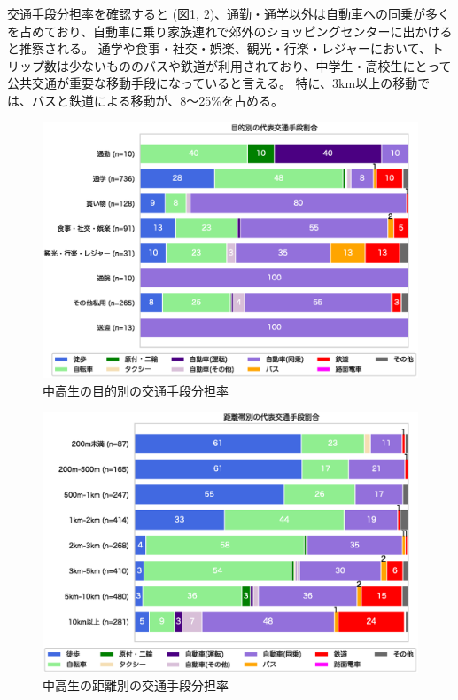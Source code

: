 \documentclass[a4paper,12pt, uplatex]{jsbook}
\begin{document}
\clearpage
交通手段分担率を確認すると (図\ref{fig:mode_share_purpose_school}, \ref{fig:mode_share_dist_school})、通勤・通学以外は自動車への同乗が多くを占めており、自動車に乗り家族連れで郊外のショッピングセンターに出かけると推察される。
通学や食事・社交・娯楽、観光・行楽・レジャーにおいて、トリップ数は少ないもののバスや鉄道が利用されており、中学生・高校生にとって公共交通が重要な移動手段になっていると言える。
特に、3km以上の移動では、バスと鉄道による移動が、8〜25\%を占める。
%
\begin{figure}[htbp]
    \centering
    \includegraphics[width=1.0\textwidth]{picture/mode_share_purpose_中高生.eps}
    \caption{中高生の目的別の交通手段分担率}
    \label{fig:mode_share_purpose_school}
\end{figure}
%
\begin{figure}[htbp]
    \centering
    \includegraphics[width=1.0\textwidth]{picture/mode_share_distance_中高生.eps}
    \caption{中高生の距離別の交通手段分担率}
    \label{fig:mode_share_dist_school}
\end{figure}
\end{document}
